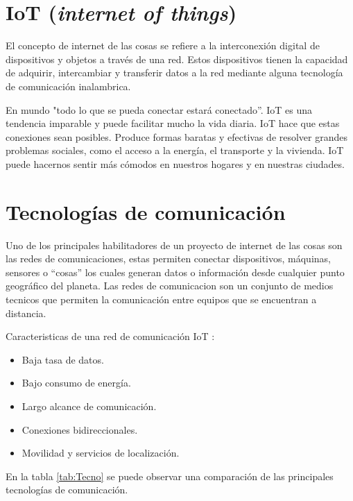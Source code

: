 \section{IoT (\textit{internet of things})}
El concepto de internet de las cosas se refiere a la interconexión digital de dispositivos y objetos  a través  de una red. Estos dispositivos tienen la capacidad de adquirir, intercambiar y transferir datos a la red mediante alguna tecnología de comunicación inalambrica.

En mundo "todo lo que se pueda conectar estará conectado”. IoT es una tendencia imparable y puede facilitar mucho la vida diaria. IoT hace que estas conexiones sean posibles. Produce formas baratas y efectivas de resolver grandes problemas sociales, como el acceso a la energía, el transporte y la vivienda. IoT puede hacernos sentir más cómodos en nuestros hogares y en nuestras ciudades.

\section{Tecnologías de comunicación}
Uno de los principales habilitadores de un proyecto de internet de las cosas son las redes de comunicaciones, estas permiten conectar dispositivos, máquinas, sensores o “cosas” los cuales generan datos o información desde cualquier punto geográfico del planeta. Las redes de comunicacion son un conjunto de medios tecnicos que permiten la comunicación entre equipos que se encuentran a distancia.

Caracteristicas de una red de comunicación IoT :
\begin{itemize}
	\item Baja tasa de datos.
	\item Bajo consumo de energía.
	\item Largo alcance de comunicación.
	\item Conexiones bidireccionales.
	\item Movilidad y servicios de localización.

\end{itemize}

En la tabla \ref{tab:Tecno} se puede observar una comparación de las principales tecnologías de comunicación.

